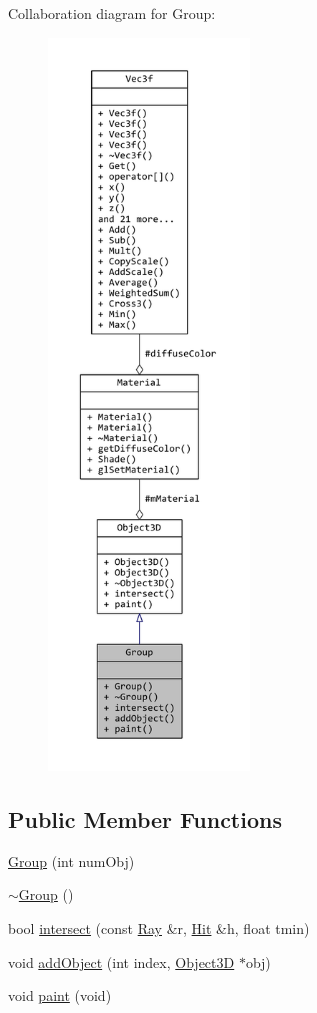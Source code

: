 Collaboration diagram for Group\+:
\nopagebreak
\begin{figure}[H]
\begin{center}
\leavevmode
\includegraphics[height=550pt]{classGroup__coll__graph}
\end{center}
\end{figure}
\subsection*{Public Member Functions}
\begin{DoxyCompactItemize}
\item 
\hyperlink{classGroup_aa8b46062ab10d8142daf419be2073c1c}{Group} (int num\+Obj)
\item 
\hyperlink{classGroup_aed00a22ff227ee2657ae44a5cbcedf7c}{$\sim$\+Group} ()
\item 
bool \hyperlink{classGroup_aa09c8e6bce2db3666c1bae2c2fd9688b}{intersect} (const \hyperlink{classRay}{Ray} \&r, \hyperlink{classHit}{Hit} \&h, float tmin)
\item 
void \hyperlink{classGroup_a08dfa34262ba52b8ccf23da53b8482ac}{add\+Object} (int index, \hyperlink{classObject3D}{Object3\+D} $\ast$obj)
\item 
void \hyperlink{classGroup_a5819c152b89a964e7e5aeab4c586cf6f}{paint} (void)
\end{DoxyCompactItemize}
